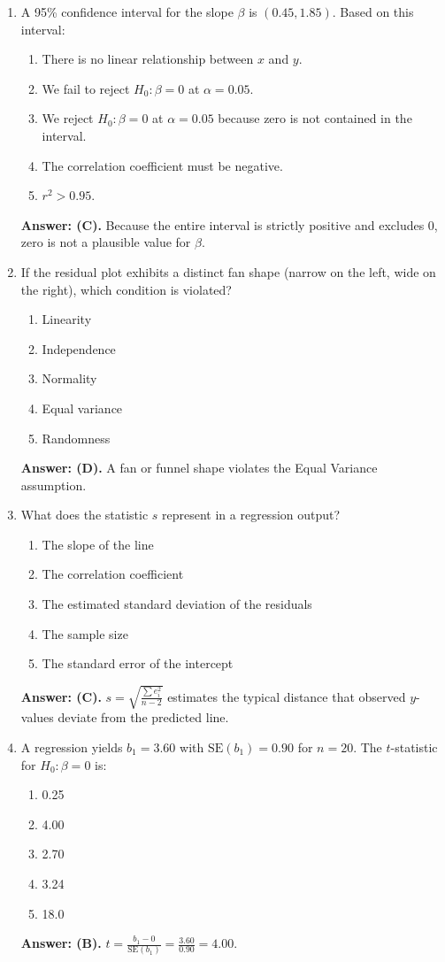 \begin{enumerate}[leftmargin=1.5em]
  \item A 95\% confidence interval for the slope $\beta$ is $(0.45, 1.85)$. Based on this interval:
  \begin{enumerate}[label=(\Alph*)]
    \item There is no linear relationship between $x$ and $y$. \item We fail to reject $H_0: \beta = 0$ at $\alpha = 0.05$. \item We reject $H_0: \beta = 0$ at $\alpha = 0.05$ because zero is not contained in the interval. \item The correlation coefficient must be negative. \item $r^2 > 0.95$.
  \end{enumerate}
  \textbf{Answer: (C).} Because the entire interval is strictly positive and excludes 0, zero is not a plausible value for $\beta$.

  \item If the residual plot exhibits a distinct fan shape (narrow on the left, wide on the right), which condition is violated?
  \begin{enumerate}[label=(\Alph*)]
    \item Linearity \item Independence \item Normality \item Equal variance \item Randomness
  \end{enumerate}
  \textbf{Answer: (D).} A fan or funnel shape violates the Equal Variance assumption.

  \item What does the statistic $s$ represent in a regression output?
  \begin{enumerate}[label=(\Alph*)]
    \item The slope of the line \item The correlation coefficient \item The estimated standard deviation of the residuals \item The sample size \item The standard error of the intercept
  \end{enumerate}
  \textbf{Answer: (C).} $s = \sqrt{\frac{\sum e_i^2}{n-2}}$ estimates the typical distance that observed $y$-values deviate from the predicted line.

  \item A regression yields $b_1 = 3.60$ with $\text{SE}(b_1) = 0.90$ for $n = 20$. The $t$-statistic for $H_0: \beta = 0$ is:
  \begin{enumerate}[label=(\Alph*)]
    \item 0.25 \item 4.00 \item 2.70 \item 3.24 \item 18.0
  \end{enumerate}
  \textbf{Answer: (B).} $t = \frac{b_1 - 0}{\text{SE}(b_1)} = \frac{3.60}{0.90} = 4.00$.


\end{enumerate}
